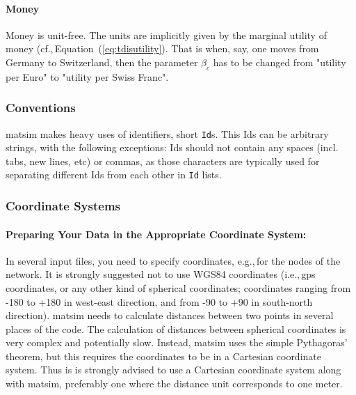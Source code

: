 \paragraph{Money}

Money is unit-free. The units are implicitly given by the marginal utility of money (cf.,\,Equation~(\ref{eq:tdisutility}). That is when, say, one moves from Germany to Switzerland, then the parameter $\beta_c$ has to be changed from "utility per Euro" to "utility per Swiss Franc".

\subsubsection{Conventions}
\gls{matsim} makes heavy uses of identifiers, short \lstinline|Id|s. This Ids can be arbitrary strings, with the following exceptions: Ids should not contain any spaces (incl. tabs, new lines, etc) or commas, as those characters are typically used for separating different Ids from each other in \lstinline|Id| lists. 

\subsubsection{Coordinate Systems}
\label{sec:coordinatesystems}
\paragraph{Preparing Your Data in the Appropriate Coordinate System:}
In several input files, you need to specify coordinates, e.g.,\,for the nodes of the network. It is strongly suggested not to use WGS84 coordinates (i.e.,\,\gls{gps} coordinates, or any other kind of spherical coordinates; coordinates ranging from -180 to +180 in west-east direction, and from -90 to +90 in south-north direction). \gls{matsim} needs to calculate distances between two points in several places of the code. The calculation of distances between spherical coordinates is very complex and potentially slow. Instead, \gls{matsim} uses the simple Pythagoras' theorem, but this requires the coordinates to be in a Cartesian coordinate system. Thus is is strongly advised to use a Cartesian coordinate system along with \gls{matsim}, preferably one where the distance unit corresponds to one meter.

